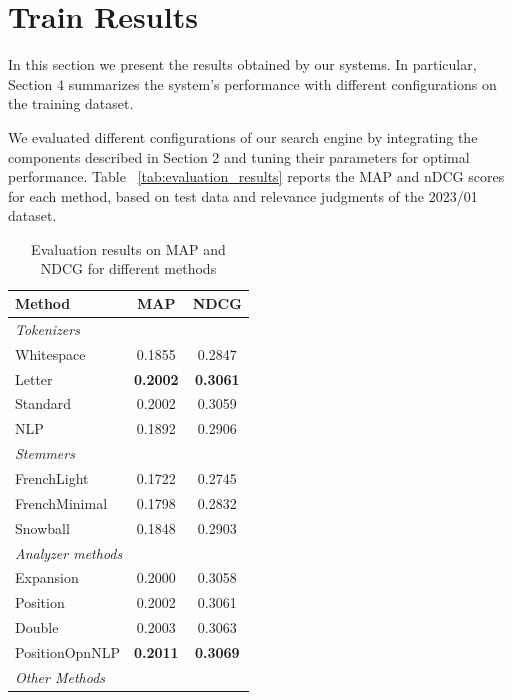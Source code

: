 \newpage
\section{Train Results}
\label{sec:trainresults}

In this section we present the results obtained by our systems. In particular, Section 4 summarizes the system's performance with different configurations on the training dataset. 

We evaluated different configurations of our search engine by integrating the components described in Section 2 and tuning their parameters for optimal performance. Table ~\ref{tab:evaluation_results} reports the MAP and nDCG scores for each method, based on test data and relevance judgments of the 2023/01 dataset.

\begin{table}[ht]
\centering
\caption{Evaluation results on MAP and NDCG for different methods}
\label{evaluations_results}
\begin{tabular}{|l|c|c|}
\hline
\rowcolor{gray!20}
\textbf{Method} & \textbf{MAP} & \textbf{NDCG} \\
\hline
\multicolumn{3}{|l|}{\footnotesize\textit{Tokenizers}} \\
Whitespace                     & 0.1855 & 0.2847 \\
Letter                         & \textbf{0.2002} & \textbf{0.3061} \\
Standard                       & 0.2002 & 0.3059 \\
NLP                            & 0.1892 & 0.2906 \\
\hline
\multicolumn{3}{|l|}{\footnotesize\textit{Stemmers}} \\
FrenchLight                    & 0.1722 & 0.2745 \\
FrenchMinimal                  & 0.1798 & 0.2832 \\
Snowball                       & 0.1848 & 0.2903 \\
\hline
\multicolumn{3}{|l|}{\footnotesize\textit{Analyzer methods}} \\
Expansion               & 0.2000 & 0.3058 \\
Position                & 0.2002 & 0.3061 \\
Double                  & 0.2003 & 0.3063 \\
PositionOpnNLP          & \textbf{0.2011} & \textbf{0.3069} \\
\hline
\multicolumn{3}{|l|}{\footnotesize\textit{Other Methods}} \\

\end{tabular}
\end{table}
